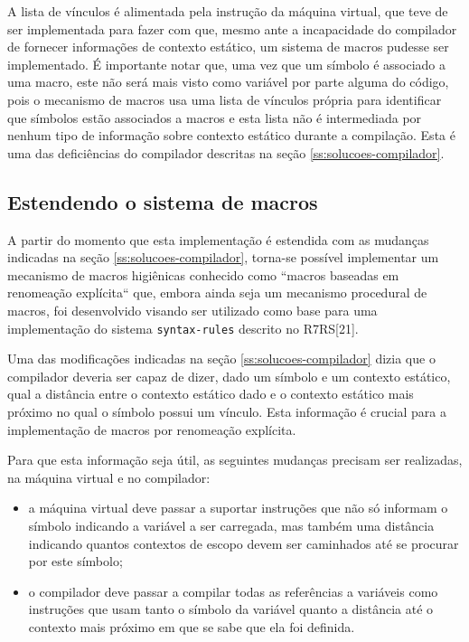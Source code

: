 A lista de vínculos é alimentada pela instrução  da máquina
virtual, que teve de ser implementada para fazer com que, mesmo ante a
incapacidade do compilador de fornecer informações de contexto estático, um
sistema de macros pudesse ser implementado. É importante notar que, uma vez que
um símbolo é associado a uma macro, este não será mais visto como variável por
parte alguma do código, pois o mecanismo de macros usa uma lista de vínculos
própria para identificar que símbolos estão associados a macros e esta lista
não é intermediada por nenhum tipo de informação sobre contexto estático
durante a compilação. Esta é uma das deficiências do compilador descritas na
seção \ref{ss:solucoes-compilador}.

\subsection{Estendendo o sistema de macros}
\label{ss:solucoes-macros}

A partir do momento que esta implementação é estendida com as mudanças indicadas
na seção \ref{ss:solucoes-compilador}, torna-se possível implementar um 
mecanismo de macros higiênicas conhecido como ``macros baseadas em renomeação
explícita`` que, embora ainda seja um mecanismo procedural de macros, foi
desenvolvido visando ser utilizado como base para uma implementação do sistema
\texttt{syntax-rules} descrito no \acs{R7RS}[21].

Uma das modificações indicadas na seção \ref{ss:solucoes-compilador} dizia que
o compilador deveria ser capaz de dizer, dado um símbolo e um contexto estático,
qual a distância entre o contexto estático dado e o contexto estático mais
próximo no qual o símbolo possui um vínculo. Esta informação é crucial para
a implementação de macros por renomeação explícita.

Para que esta informação seja útil, as seguintes mudanças precisam ser 
realizadas, na máquina virtual e no compilador: 

\begin{itemize}

\item a máquina virtual deve passar a suportar instruções  que não
só informam o símbolo indicando a variável a ser carregada, mas também uma
distância indicando quantos contextos de escopo devem ser caminhados até se
procurar por este símbolo;

\item o compilador deve passar a compilar todas as referências a variáveis
como instruções  que usam tanto o símbolo da variável quanto a
distância até o contexto mais próximo em que se sabe que ela foi definida.

\end{itemize}

